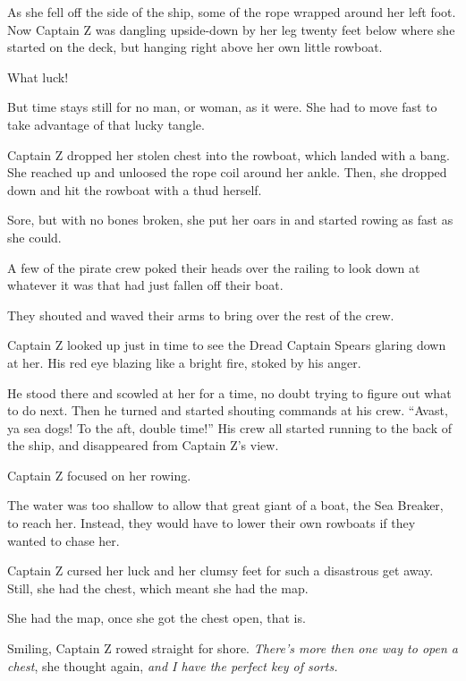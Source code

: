 \documentclass[12pt]{extbook}
\begin{document}
  As she fell off the side of the ship, some of the rope wrapped around
  her left foot. Now Captain Z was dangling upside-down by her leg twenty
  feet below where she started on the deck, but hanging right above her
  own little rowboat.
  
  What luck!
  
  But time stays still for no man, or woman, as it were. She had to move
  fast to take advantage of that lucky tangle.
  
  Captain Z dropped her stolen chest into the rowboat, which landed with a
  bang. She reached up and unloosed the rope coil around her ankle. Then,
  she dropped down and hit the rowboat with a thud herself.
  
  Sore, but with no bones broken, she put her oars in and started rowing
  as fast as she could.
  
  A few of the pirate crew poked their heads over the railing to look down
  at whatever it was that had just fallen off their boat.
  
  They shouted and waved their arms to bring over the rest of the crew.
  
  Captain Z looked up just in time to see the Dread Captain Spears glaring
  down at her. His red eye blazing like a bright fire, stoked by his
  anger.
  
  He stood there and scowled at her for a time, no doubt trying to figure
  out what to do next. Then he turned and started shouting commands at his
  crew. \enquote{Avast, ya sea dogs! To the aft, double time!} His crew
  all started running to the back of the ship, and disappeared from
  Captain Z's view.
  
  Captain Z focused on her rowing.
  
  The water was too shallow to allow that great giant of a boat, the Sea
  Breaker, to reach her. Instead, they would have to lower their own
  rowboats if they wanted to chase her.
  
  Captain Z cursed her luck and her clumsy feet for such a disastrous get
  away. Still, she had the chest, which meant she had the map.
  
  She had the map, once she got the chest open, that is.
  
  Smiling, Captain Z rowed straight for shore. \emph{There's more then one
  way to open a chest}, she thought again, \emph{and I have the perfect
  key of sorts.}
  
  \section{}\label{section-8}
  
\end{document}
